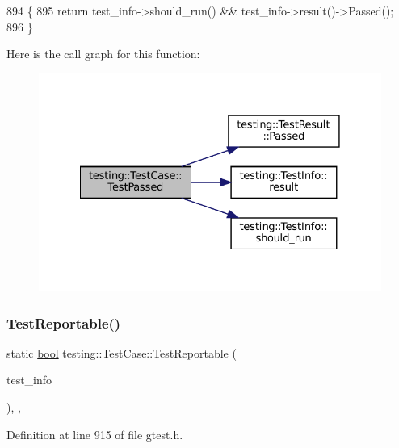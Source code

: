 \begin{DoxyCode}
894                                                     \{
895     \textcolor{keywordflow}{return} test\_info->should\_run() && test\_info->result()->Passed();
896   \}
\end{DoxyCode}
Here is the call graph for this function\+:
\nopagebreak
\begin{figure}[H]
\begin{center}
\leavevmode
\includegraphics[width=328pt]{classtesting_1_1TestCase_ad8d9e1ebc410000b679002ba71d78686_cgraph}
\end{center}
\end{figure}
\mbox{\label{classtesting_1_1TestCase_a2c3767df71e07939b32f19ef9c6ed271}} 
\subsubsection{\texorpdfstring{Test\+Reportable()}{TestReportable()}}
{\footnotesize\ttfamily static \hyperlink{classbool}{bool} testing\+::\+Test\+Case\+::\+Test\+Reportable (\begin{DoxyParamCaption}\item[{const \hyperlink{classtesting_1_1TestInfo}{Test\+Info} $\ast$}]{test\+\_\+info }\end{DoxyParamCaption})\hspace{0.3cm}{\ttfamily [inline]}, {\ttfamily [static]}, {\ttfamily [private]}}



Definition at line 915 of file gtest.\+h.



